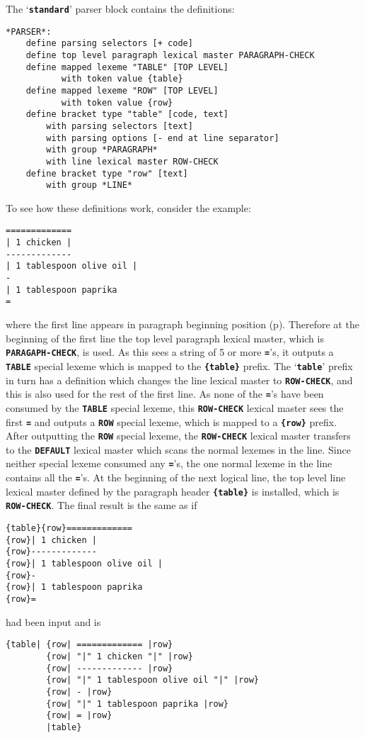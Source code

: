\documentclass[12pt]{article}
\newcommand{\TT}[1]{{\tt \bfseries #1}}
\newcommand{\pagref}[1]{p\pageref{#1}}
\newenvironment{indpar}[1][0.3in]%
	{\begin{list}{}%
		     {\setlength{\itemsep}{0in}%
		      \setlength{\topsep}{0in}%
		      \setlength{\parsep}{1ex}%
		      \setlength{\labelwidth}{#1}%
		      \setlength{\leftmargin}{#1}%
		      \addtolength{\leftmargin}{\labelsep}}%
	 \item}%
	{\end{list}}
\begin{document}
The `\TT{standard}' parser block contains the definitions:
\begin{indpar}\begin{verbatim}
*PARSER*:
    define parsing selectors [+ code]
    define top level paragraph lexical master PARAGRAPH-CHECK
    define mapped lexeme "TABLE" [TOP LEVEL]
           with token value {table}
    define mapped lexeme "ROW" [TOP LEVEL]
           with token value {row}
    define bracket type "table" [code, text]
        with parsing selectors [text]
        with parsing options [- end at line separator]
        with group *PARAGRAPH*
        with line lexical master ROW-CHECK
    define bracket type "row" [text]
        with group *LINE*
\end{verbatim}\end{indpar}

To see how these definitions work, consider the example:
\begin{indpar}\begin{verbatim}
=============
| 1 chicken |
-------------
| 1 tablespoon olive oil |
-
| 1 tablespoon paprika
=
\end{verbatim}\end{indpar}
where the first line appears in paragraph beginning position
(\pagref{PARAGRAPH-BEGINNING-POSITION}).
Therefore at the beginning of the first line the top level
paragraph lexical master, which is \TT{PARAGAPH-CHECK}, is used.
As this
sees a string of 5 or more \TT{=}'s, it outputs a \TT{TABLE}
special lexeme which is mapped to the \TT{\{table\}} prefix.
The `\TT{table}' prefix in turn has a definition which
changes the line lexical master to \TT{ROW-CHECK}, and this
is also used for the rest of the first line.  As none
of the \TT{=}'s have been consumed by the \TT{TABLE} special
lexeme, this \TT{ROW-CHECK} lexical master sees the first \TT{=} and
outputs a \TT{ROW} special lexeme, which is mapped to a
\TT{\{row\}} prefix.  After outputting the \TT{ROW} special
lexeme, the \TT{ROW-CHECK} lexical master transfers to the
\TT{DEFAULT} lexical master which scans the normal lexemes
in the line.  Since neither special lexeme consumed any \TT{=}'s,
the one normal lexeme in the line contains all the
\TT{=}'s.  At the beginning of the next logical line, the
top level line lexical master defined by the paragraph header
\TT{\{table\}} is installed, which is
\TT{ROW-CHECK}.  The final result is the same as if
\begin{indpar}\begin{verbatim}
{table}{row}=============
{row}| 1 chicken |
{row}-------------
{row}| 1 tablespoon olive oil |
{row}-
{row}| 1 tablespoon paprika
{row}=
\end{verbatim}\end{indpar}
had been input and is
\begin{indpar}\begin{verbatim}
{table| {row| ============= |row}
        {row| "|" 1 chicken "|" |row}
        {row| ------------- |row}
        {row| "|" 1 tablespoon olive oil "|" |row}
        {row| - |row}
        {row| "|" 1 tablespoon paprika |row}
        {row| = |row}
        |table}
\end{verbatim}\end{indpar}
\end{document}
